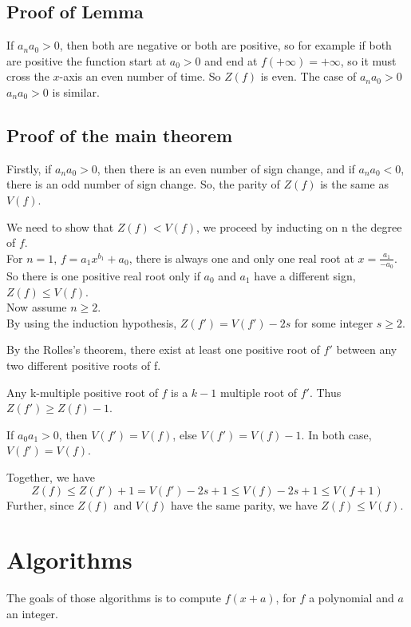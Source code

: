 \documentclass[a4paper,12pt]{article}
\begin{document}
\subsection*{Proof of Lemma}
If \(a_n a_0 > 0\), then both are negative or both are positive, so for example if both 
are positive the function start at \(a_0 >0\) and end at \(f(+\infty)=+\infty\), so it must
cross the \(x\)-axis an even number of time. So \( Z(f) \) is even. The case of \(a_n a_0 > 0\)\(a_n a_0 > 0\) is similar.

\subsection*{Proof of the main theorem}

Firstly, if \(a_n a_0 >0\), then there is an even number of sign change, and if \(a_n a_0<0\), there is an odd number of sign change.
So, the parity of \(Z(f)\) is the same as \(V(f)\).

We need to show that \(Z(f) < V(f)\), we proceed by inducting on n the degree of \(f\).
\\

For \(n=1\), \(f=a_1x^{b_1}+a_0\), there is always one and only one real root at 
\(x=\frac{a_1}{-a_0}\). So there is one positive real root only if \(a_0\) and \(a_1\) have a different sign, \(Z(f) \leq V(f)\).
\\

Now assume \(n \geq 2\).
\\

By using the induction hypothesis, \(Z(f') = V(f') - 2s\) for some integer \(s \geq 2\).

By the Rolles's theorem, there exist at least one positive root of \(f'\) between any two different positive roots of f.

Any k-multiple positive root of \(f\) is a \(k-1\) multiple root of \(f'\). Thus \(Z(f') \geq Z(f)-1\).

If \(a_0 a_1 > 0\), then \(V(f')=V(f)\), else \(V(f')=V(f)-1\). In both case, \(V(f')=V(f)\).

Together, we have
\[Z(f) \leq Z(f')+1 = V(f') -2s +1 \leq V(f) -2s+1 \leq V(f+1)\]
Further, since \(Z(f)\) and \(V(f)\) have the same parity, we have \(Z(f) \leq V(f)\).

\section{Algorithms}

The goals of those algorithms is to compute \(f(x+a)\), for \(f\) a polynomial and \(a\) an integer.
\end{document}
